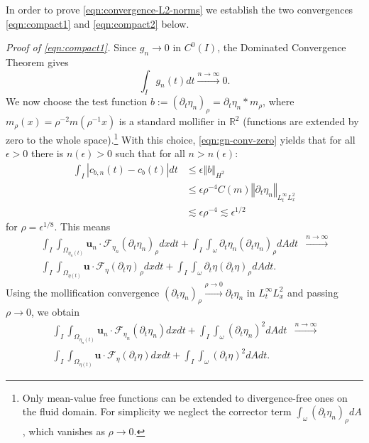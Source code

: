 \documentclass[10pt,a4paper]{article}
\numberwithin{equation}{section}
\begin{document}
In order to prove \eqref{eqn:convergence-L2-norms} we establish the two convergences \eqref{eqn:compact1} and \eqref{eqn:compact2} below.

\noindent\textit{Proof of \eqref{eqn:compact1}.}
Since $g_n \to 0$ in $C^0(I)$, the Dominated Convergence Theorem gives
\begin{equation}\label{eqn:gn-conv-zero}
\int_{I}g_{n}\left(t\right)dt\xrightarrow{n\to\infty}0.
\end{equation}
We now choose the test function $b := \left(\partial_{t}\eta_{n}\right)_{\rho} = \partial_{t}\eta_{n}\ast m_{\rho}$, where $m_{\rho}\left(x\right)=\rho^{-2}m\left(\rho^{-1}x\right)$ is a standard mollifier in $\mathbb{R}^{2}$ (functions are extended by zero to the whole space).\footnote{Only mean-value free functions can be extended to divergence-free ones on the fluid domain. For simplicity we neglect the corrector term $\int_{\omega}\left(\partial_{t}\eta_{n}\right)_{\rho}dA$, which vanishes as $\rho\to 0$.}
With this choice, \eqref{eqn:gn-conv-zero} yields that for all $\epsilon>0$ there is $n(\epsilon)>0$ such that for all $n>n(\epsilon)$:
\begin{equation}
\begin{aligned}\int_{I}\left|c_{b,n}\left(t\right)-c_{b}\left(t\right)\right|dt & \le\epsilon\left\Vert b\right\Vert _{H^{2}}\\
 & \le\epsilon\rho^{-4}C\left(m\right)\left\Vert \partial_{t}\eta_{n}\right\Vert _{L_{t}^{\infty}L_{x}^{2}}\\
 & \lesssim\epsilon\rho^{-4}\lesssim\epsilon^{1/2}
\end{aligned}
\end{equation}
for $\rho=\epsilon^{1/8}$. This means
\begin{equation}
\begin{aligned}\int_{I}\int_{\Omega_{\eta_{n}\left(t\right)}}\mathbf{u}_{n}\cdot\mathcal{F}_{\eta_{n}}\left(\partial_{t}\eta_{n}\right)_{\rho}dxdt+\int_{I}\int_{\omega}\partial_{t}\eta_{n}\left(\partial_{t}\eta_{n}\right)_{\rho}dAdt & \xrightarrow{n\to\infty}\\
\int_{I}\int_{\Omega_{\eta\left(t\right)}}\mathbf{u}\cdot\mathcal{F}_{\eta}\left(\partial_{t}\eta\right)_{\rho}dxdt+\int_{I}\int_{\omega}\partial_{t}\eta\left(\partial_{t}\eta\right)_{\rho}dAdt.
\end{aligned}
\end{equation}
Using the mollification convergence $\left(\partial_{t}\eta_{n}\right)_{\rho}\xrightarrow{\rho\to0}\partial_{t}\eta_{n}$ in $L_{t}^{\infty}L_{x}^{2}$ and passing $\rho\to 0$, we obtain
\begin{equation}\label{eqn:compact1}
\begin{aligned}\int_{I}\int_{\Omega_{\eta_{n}\left(t\right)}}\mathbf{u}_{n}\cdot\mathcal{F}_{\eta_{n}}\left(\partial_{t}\eta_{n}\right)dxdt+\int_{I}\int_{\omega}\left(\partial_{t}\eta_{n}\right)^{2}dAdt & \xrightarrow{n\to\infty}\\
\int_{I}\int_{\Omega_{\eta\left(t\right)}}\mathbf{u}\cdot\mathcal{F}_{\eta}\left(\partial_{t}\eta\right)dxdt+\int_{I}\int_{\omega}\left(\partial_{t}\eta\right)^{2}dAdt.
\end{aligned}
\end{equation}
\end{document}
